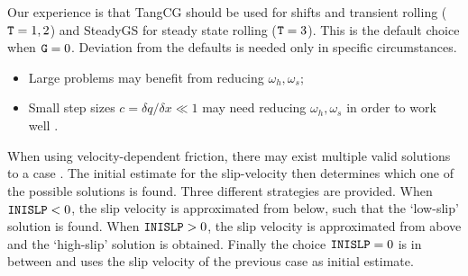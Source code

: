 \documentclass[12pt]{report}
\begin{document}
Our experience is that TangCG should be used for shifts and transient
rolling (${\tt T}=1,2$) and SteadyGS for steady state rolling (${\tt T}=3$).
This is the default choice when ${\tt G}=0$. Deviation from the defaults
is needed only in specific circumstances. 
\begin{itemize}
\item Large problems may benefit from reducing $\omega_h, \omega_s$;
\item Small step sizes $c=\delta q/\delta x \ll 1$ may need reducing
        $\omega_h, \omega_s$ in order to work well
        \cite{Vollebregt2009a-cm2009}.
\end{itemize}

When using velocity-dependent friction, there may exist multiple valid
solutions to a case \cite{Croft2010-iwrn10,Vollebregt2012a-quasistd}. The
initial estimate for the slip-velocity then determines which one of the
possible solutions is found. Three different strategies are provided. When
${\tt INISLP}<0$, the slip velocity is approximated from below, such that the
`low-slip' solution is found. When ${\tt INISLP}>0$, the slip velocity is
approximated from above and the `high-slip' solution is obtained. Finally
the choice ${\tt INISLP}=0$ is in between and uses the slip velocity of the
previous case as initial estimate.
\end{document}
